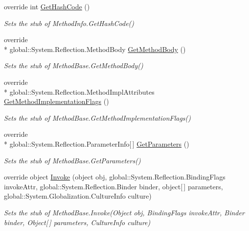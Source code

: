 \begin{DoxyCompactItemize}
override int \hyperlink{class_system_1_1_reflection_1_1_fakes_1_1_stub_method_info_a8adb282cca59c2806e8252591acd28a4}{Get\-Hash\-Code} ()
\begin{DoxyCompactList}\small\item\em Sets the stub of Method\-Info.\-Get\-Hash\-Code()\end{DoxyCompactList}\item 
override \\*
global\-::\-System.\-Reflection.\-Method\-Body \hyperlink{class_system_1_1_reflection_1_1_fakes_1_1_stub_method_info_a98d6f1b1ba87f7c68022ddb4457a0fd3}{Get\-Method\-Body} ()
\begin{DoxyCompactList}\small\item\em Sets the stub of Method\-Base.\-Get\-Method\-Body()\end{DoxyCompactList}\item 
override \\*
global\-::\-System.\-Reflection.\-Method\-Impl\-Attributes \hyperlink{class_system_1_1_reflection_1_1_fakes_1_1_stub_method_info_a5db22deb0ac161c5cd17ef3166f0a44e}{Get\-Method\-Implementation\-Flags} ()
\begin{DoxyCompactList}\small\item\em Sets the stub of Method\-Base.\-Get\-Method\-Implementation\-Flags()\end{DoxyCompactList}\item 
override \\*
global\-::\-System.\-Reflection.\-Parameter\-Info\mbox{[}$\,$\mbox{]} \hyperlink{class_system_1_1_reflection_1_1_fakes_1_1_stub_method_info_a41e666bd4fdc07335ff96185cbd6707a}{Get\-Parameters} ()
\begin{DoxyCompactList}\small\item\em Sets the stub of Method\-Base.\-Get\-Parameters()\end{DoxyCompactList}\item 
override object \hyperlink{class_system_1_1_reflection_1_1_fakes_1_1_stub_method_info_ae2dd7332e841ddbd52256b6d81d01b20}{Invoke} (object obj, global\-::\-System.\-Reflection.\-Binding\-Flags invoke\-Attr, global\-::\-System.\-Reflection.\-Binder binder, object\mbox{[}$\,$\mbox{]} parameters, global\-::\-System.\-Globalization.\-Culture\-Info culture)
\begin{DoxyCompactList}\small\item\em Sets the stub of Method\-Base.\-Invoke(\-Object obj, Binding\-Flags invoke\-Attr, Binder binder, Object\mbox{[}$\,$\mbox{]} parameters, Culture\-Info culture)\end{DoxyCompactList}\item 

\end{DoxyCompactItemize}

